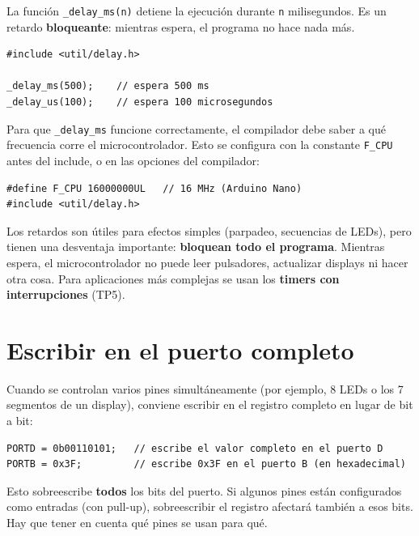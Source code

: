 La función \texttt{\_delay\_ms(n)} detiene la ejecución durante \texttt{n}
milisegundos. Es un retardo \textbf{bloqueante}: mientras espera, el programa no
hace nada más.

\begin{lstlisting}[style=estilo-c]
#include <util/delay.h>

_delay_ms(500);    // espera 500 ms
_delay_us(100);    // espera 100 microsegundos
\end{lstlisting}

\begin{importantebox}
Para que \texttt{\_delay\_ms} funcione correctamente, el compilador debe saber a qué
frecuencia corre el microcontrolador. Esto se configura con la constante \texttt{F\_CPU}
antes del include, o en las opciones del compilador:
\begin{lstlisting}[style=estilo-c]
#define F_CPU 16000000UL   // 16 MHz (Arduino Nano)
#include <util/delay.h>
\end{lstlisting}
\end{importantebox}

Los retardos son útiles para efectos simples (parpadeo, secuencias de LEDs), pero
tienen una desventaja importante: \textbf{bloquean todo el programa}. Mientras
espera, el microcontrolador no puede leer pulsadores, actualizar displays ni hacer
otra cosa. Para aplicaciones más complejas se usan los \textbf{timers con
interrupciones} (TP5).

\section{Escribir en el puerto completo}

Cuando se controlan varios pines simultáneamente (por ejemplo, 8 LEDs o los 7
segmentos de un display), conviene escribir en el registro completo en lugar de bit
a bit:

\begin{lstlisting}[style=estilo-c]
PORTD = 0b00110101;   // escribe el valor completo en el puerto D
PORTB = 0x3F;         // escribe 0x3F en el puerto B (en hexadecimal)
\end{lstlisting}

\begin{advertenciabox}
Esto sobreescribe \textbf{todos} los bits del puerto. Si algunos pines están
configurados como entradas (con pull-up), sobreescribir el registro afectará también
a esos bits. Hay que tener en cuenta qué pines se usan para qué.
\end{advertenciabox}

